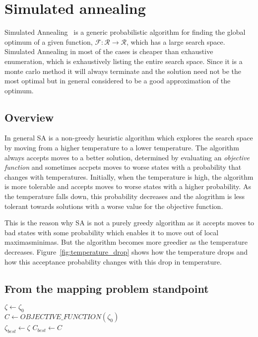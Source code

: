 \section{Simulated annealing}
\label{sec:simulated-annealing}

Simulated Annealing~\cite{kirkpatrick} is a generic probabilistic algorithm for
finding the global optimum of a given function,
$\mathcal{F}:\mathcal{R}\rightarrow\mathcal{R}$, which has a large search space.
Simulated Annealing in most of the cases is cheaper than exhaustive enumeration,
which is exhaustively listing the entire search space. Since it is a monte carlo
method it will always terminate and the solution need not be the most optimal
but in general considered to be a good approximation of the optimum.

\subsection{Overview}

In general SA is a non-greedy heuristic algorithm which explores the search
space by moving from a higher temperature to a lower temperature. The algorithm
always accepts moves to a better solution, determined by evaluating an
\emph{objective function} and sometimes accpets moves to worse states with a
probability that changes with temperatures. Initially, when the temperature is
high, the algorithm is more tolerable and accepts moves to worse states with a
higher probability. As the temperature falls down, this probability decreases
and the alogrithm is less tolerant towards solutions with a worse value for the
objective function.

This is the reason why SA is not a purely greedy algorithm as it accepts moves
to bad states with some probability which enables it to move out of local
maximas\/minimas. But the algorithm becomes more greedier as the temperature
decreases. Figure~\ref{fig:temperature_drop} shows how the temperature drops and
how this acceptance probability changes with this drop in temperature.

\subsection{From the mapping problem standpoint}

\begin{algorithm}
\DontPrintSemicolon
{}
\begin{algorithmic}[1]
$\zeta \leftarrow \zeta_0$ \\
$C \leftarrow OBJECTIVE\_FUNCTION(\zeta_0)$ \\
$\zeta_{best} \leftarrow \zeta$
$C_{best} \leftarrow C$

\caption{$Simulated\_Annealing(\zeta_0, T_0)$}
\label{algo:SA}
\end{algorithmic}
\end{algorithm}

